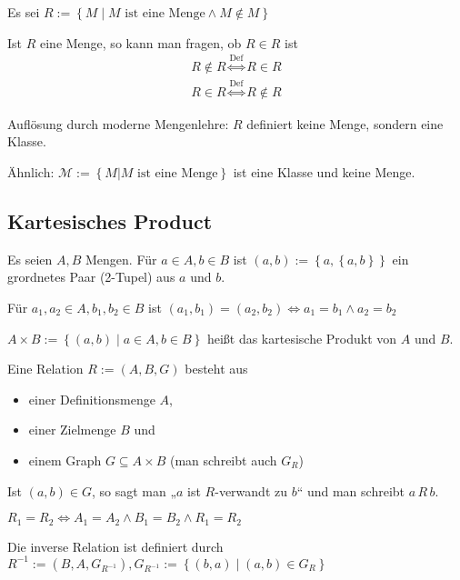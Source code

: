 \begin{remark}
  Es sei $R := \left\{ M \middle| M \text{ ist eine Menge} \wedge M \not\in M \right\}$

  Ist $R$ eine Menge, so kann man fragen, ob $R \in R$ ist
  \begin{align*}
    R \not\in R \stackrel{\text{Def}}{\iff} R \in R \\
    R \in R \stackrel{\text{Def}}{\iff} R \not\in R
  \end{align*}

  Auflösung durch moderne Mengenlehre: $R$ definiert keine Menge, sondern eine Klasse.

  Ähnlich: $\mathscr{M} := \left\{ M | M \text{ ist eine Menge} \right\}$ ist eine Klasse und keine Menge.
\end{remark}

\subsection{Kartesisches Product}
\begin{definition}
  Es seien $A, B$ Mengen. Für $a \in A, b \in B$ ist $(a, b) := \left\{ a, \left\{ a, b \right\} \right\}$ ein grordnetes Paar (2-Tupel) aus $a$ und $b$.

  Für $a_1, a_2 \in A, b_1, b_2 \in B$ ist $(a_1, b_1) = (a_2, b_2) \iff a_1 = b_1 \wedge a_2 = b_2$

  $A \times B := \left\{ (a, b) \middle| a \in A, b \in B \right\}$ heißt das kartesische Produkt von $A$ und $B$.\index[sym]{$\times$}
\end{definition}

\begin{definition}
  Eine Relation $R := (A, B, G)$ besteht aus
  \begin{itemize}
  \item einer Definitionsmenge $A$,
  \item einer Zielmenge $B$ und
  \item einem Graph $G \subseteq A \times B$ (man schreibt auch $G_R$)
  \end{itemize}

  Ist $(a, b) \in G$, so sagt man „$a$ ist $R$-verwandt zu $b$“ und man schreibt $a\, R\, b$.

  $R_1 = R_2 \iff A_1 = A_2 \wedge B_1 = B_2 \wedge R_1 = R_2$

  Die inverse Relation ist definiert durch $R^{-1} := (B, A, G_{R^{-1}}), G_{R^{-1}} := \left\{ (b, a) \middle| (a, b) \in G_R \right\}$
\end{definition}


